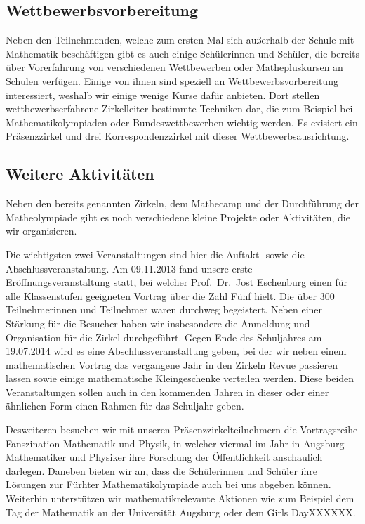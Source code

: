 \documentclass[12pt]{zettel}
\begin{document}
\subsection{Wettbewerbsvorbereitung}

Neben den Teilnehmenden, welche zum ersten Mal sich außerhalb der Schule
mit Mathematik beschäftigen gibt es auch einige Schülerinnen und
Schüler, die bereits über Vorerfahrung von verschiedenen Wettbewerben
oder Mathepluskursen an Schulen verfügen. Einige von ihnen sind speziell
an Wettbewerbsvorbereitung interessiert, weshalb wir einige wenige Kurse
dafür anbieten. Dort stellen wettbewerbserfahrene Zirkelleiter bestimmte
Techniken dar, die zum Beispiel bei Mathematikolympiaden oder
Bundeswettbewerben wichtig werden. Es exisiert ein Präsenzzirkel und
drei Korrespondenzzirkel mit dieser Wettbewerbsausrichtung.

\subsection{Weitere Aktivitäten}

Neben den bereits genannten Zirkeln, dem Mathecamp und der Durchführung
der Matheolympiade gibt es noch verschiedene kleine Projekte oder
Aktivitäten, die wir organisieren.

Die wichtigsten zwei Veranstaltungen sind hier die Auftakt- sowie die
Abschlussveranstaltung. Am 09.11.2013 fand unsere erste
Eröffnungsveranstaltung statt, bei welcher Prof.~Dr.~Jost Eschenburg
einen für alle Klassenstufen geeigneten Vortrag über die Zahl Fünf
hielt. Die über 300 Teilnehmerinnen und Teilnehmer waren durchweg
begeistert. Neben einer Stärkung für die Besucher haben wir insbesondere
die Anmeldung und Organisation für die Zirkel durchgeführt. Gegen Ende
des Schuljahres am 19.07.2014 wird es eine Abschlussveranstaltung geben,
bei der wir neben einem mathematischen Vortrag das vergangene Jahr in
den Zirkeln Revue passieren lassen sowie einige mathematische
Kleingeschenke verteilen werden. Diese beiden Veranstaltungen sollen
auch in den kommenden Jahren in dieser oder einer ähnlichen Form einen
Rahmen für das Schuljahr geben.

Desweiteren besuchen wir mit unseren Präsenzzirkelteilnehmern die
Vortragsreihe Fanszination Mathematik und Physik, in welcher viermal im
Jahr in Augsburg Mathematiker und Physiker ihre Forschung der
Öffentlichkeit anschaulich darlegen. Daneben bieten wir an, dass die
Schülerinnen und Schüler ihre Lösungen zur Fürhter Mathematikolympiade
auch bei uns abgeben können. Weiterhin unterstützen wir
mathematikrelevante Aktionen wie zum Beispiel dem Tag der Mathematik an
der Universität Augsburg oder dem Girls DayXXXXXX.
\end{document}
